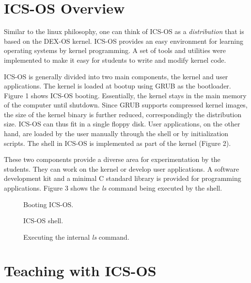 \documentclass{acm_proc_article-sp}
\begin{document}
\section{ICS-OS Overview}
Similar to the linux philosophy, one can think of ICS-OS as a 
\textit{distribution} that is based on the DEX-OS kernel. ICS-OS provides 
an easy environment for learning operating systems by kernel programming. 
A set of tools and utilities were implemented to make it easy for students
to write and modify kernel code. 

ICS-OS is generally divided into two main components, the kernel and user 
applications. The kernel is loaded at bootup using GRUB as the bootloader.
Figure 1 shows ICS-OS booting. Essentially, the kernel stays in the main memory
of the computer until shutdown. Since GRUB supports compressed kernel images, 
the size of the kernel binary is further reduced, correspondingly the 
distribution size. ICS-OS can thus fit in a single floppy disk. User 
applications, on the other hand, are loaded by the user manually through the
shell or by initialization scripts. The shell in ICS-OS is implemented as part 
of the kernel (Figure 2).

These two components provide a diverse area for experimentation by the students.
They can work on the kernel or develop user applications. A software 
development kit and a minimal C standard library is provided for programming 
applications. Figure 3 shows the \textit{ls} command being executed by the 
shell.


\begin{figure}
\centering
{}
\caption{Booting ICS-OS.}
\end{figure}

\begin{figure}
\centering
{}
\caption{ICS-OS shell.}
\end{figure}

\begin{figure}
\centering
{}
\caption{Executing the internal \textit{ls} command.}
\end{figure}


\section{Teaching with ICS-OS}
\end{document}
